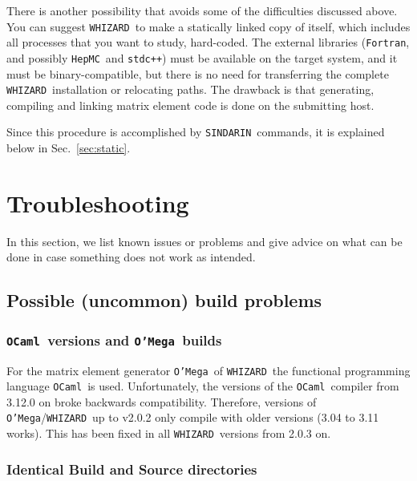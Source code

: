 \documentclass[12pt]{book}
\newcommand{\ttt}[1]{\texttt{#1}}
\newcommand{\whizard}{\texttt{WHIZARD}}
\newcommand{\oMega}{\texttt{O'Mega}}
\newcommand{\hepmc}{\texttt{HepMC}}
\newcommand{\sindarin}{\texttt{SINDARIN}}
\newcommand{\fortran}{\texttt{Fortran}}
\newcommand{\ocaml}{\texttt{OCaml}}
\begin{document}
There is another possibility that avoids some of the difficulties
discussed above.  You can suggest \whizard\ to make a statically
linked copy of itself, which includes all processes that you want to
study, hard-coded.  The external libraries (\fortran, and possibly
\hepmc\ and \ttt{stdc++}) must be available on the target system, and
it must be binary-compatible, but there is no need for transferring
the complete \whizard\ installation or relocating paths.  The drawback
is that generating, compiling and linking matrix element code is done
on the submitting host.

Since this procedure is accomplished by \sindarin\ commands, it is
explained below in Sec.~\ref{sec:static}.

\newpage

\section{Troubleshooting}

In this section, we list known issues or problems and give advice on
what can be done in case something does not work as intended. 

\subsection{Possible (uncommon) build problems}
\label{sec:buildproblems}

\subsubsection{\ocaml\ versions and \oMega\ builds}

For the matrix element generator \oMega\ of \whizard\, the functional
programming language \ocaml\ is used. Unfortunately, the versions of
the \ocaml\ compiler from 3.12.0 on broke backwards
compatibility. Therefore,  versions of \oMega/\whizard\ up to v2.0.2
only compile with older versions (3.04 to 3.11 works). This has been
fixed in all \whizard\ versions from 2.0.3 on.

\subsubsection{Identical Build and Source directories}
\end{document}
